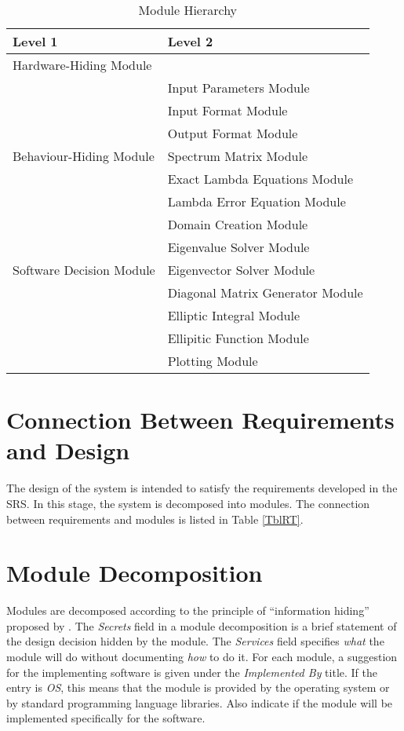 \documentclass[12pt, titlepage]{article}
\begin{document}
\begin{table}[h]
\centering
\begin{tabular}{p{} p{}}
\toprule
\textbf{Level 1} & \textbf{Level 2}\\
\midrule

{Hardware-Hiding Module} & ~ \\
\midrule

\multirow{7}{0.3\textwidth}{Behaviour-Hiding Module} 
& Input Parameters Module\\
& Input Format Module \\
& Output Format Module \\
& Spectrum Matrix Module\\
& Exact Lambda Equations Module\\
& Lambda Error Equation Module\\
& Domain Creation Module\\ 
\midrule

\multirow{3}{0.3\textwidth}{Software Decision Module} 
& Eigenvalue Solver Module \\
& Eigenvector Solver Module \\
& Diagonal Matrix Generator Module\\
& Elliptic Integral Module\\ 
& Ellipitic Function Module\\ 
& Plotting Module\\
\bottomrule

\end{tabular}
\caption{Module Hierarchy}
\label{TblMH}
\end{table}

\newpage 
\section{Connection Between Requirements and Design} \label{SecConnection}

The design of the system is intended to satisfy the requirements developed in
the SRS. In this stage, the system is decomposed into modules. The connection
between requirements and modules is listed in Table \ref{TblRT}.

\section{Module Decomposition} \label{SecMD}

Modules are decomposed according to the principle of ``information hiding''
proposed by \citet{ParnasEtAl1984}. The \emph{Secrets} field in a module
decomposition is a brief statement of the design decision hidden by the
module. The \emph{Services} field specifies \emph{what} the module will do
without documenting \emph{how} to do it. For each module, a suggestion for the
implementing software is given under the \emph{Implemented By} title. If the
entry is \emph{OS}, this means that the module is provided by the operating
system or by standard programming language libraries.  Also indicate if the
module will be implemented specifically for the software.
\end{document}
